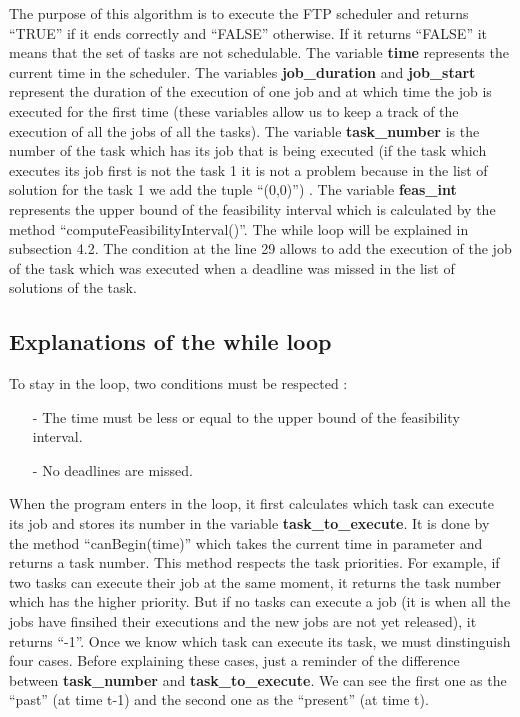 \documentclass[a4paper,12pt]{article}
\begin{document}
\smallskip
\noindent
The purpose of this algorithm is to execute the FTP scheduler and returns ``TRUE'' if it ends correctly and ``FALSE'' otherwise. If it returns ``FALSE'' it means that the set of tasks are not schedulable. The variable \textbf{time} represents the current time in the scheduler. The variables \textbf{job\_duration} and \textbf{job\_start} represent the duration of the execution of one job and at which time the job is executed for the first time (these variables allow us to keep a track of the execution of all the jobs of all the tasks). The variable \textbf{task\_number} is the number of the task which has its job that is being executed (if the task which executes its job first is not the task 1 it is not a problem because in the list of solution for the task 1 we add the tuple ``(0,0)'') . The variable \textbf{feas\_int} represents the upper bound of the feasibility interval which is calculated by the method ``computeFeasibilityInterval()''. The while loop will be explained in subsection 4.2. The condition at the line 29 allows to add the execution of the job of the task which was executed when a deadline was missed in the list of solutions of the task.

\subsection{Explanations of the while loop}

To stay in the loop, two conditions must be respected : \\
\begin{itemize}
\item[-] The time must be less or equal to the upper bound of the feasibility interval.
\item[-] No deadlines are missed. 
\end{itemize}

\smallskip
\noindent
When the program enters in the loop, it first calculates which task can execute its job and stores its number in the variable \textbf{task\_to\_execute}. It is done by the method ``canBegin(time)'' which takes the current time in parameter and returns a task number. This method respects the task priorities. For example, if two tasks can execute their job at the same moment, it returns the task number which has the higher priority. But if no tasks can execute a job (it is when all the jobs have finsihed their executions and the new jobs are not yet released), it returns ``-1''. Once we know which task can execute its task, we must dinstinguish four cases. Before explaining these cases, just a reminder of the difference between \textbf{task\_number} and \textbf{task\_to\_execute}. We can see the first one as the ``past'' (at time t-1) and the second one as the ``present'' (at time t).
\end{document}
